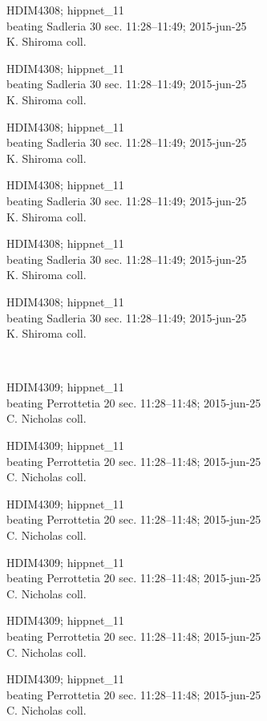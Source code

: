 \documentclass[2pt]{extarticle}
\begin{document}
\noindent
\parbox{0.16\textwidth}{\tiny \raggedright \rule[-0.3\baselineskip]{0pt}{10pt}HDIM4308; hippnet\_11\\ beating Sadleria 30 sec. 11:28--11:49; 2015-jun-25\\ K. Shiroma coll.}
\parbox{0.16\textwidth}{\tiny \raggedright \rule[-0.3\baselineskip]{0pt}{10pt}HDIM4308; hippnet\_11\\ beating Sadleria 30 sec. 11:28--11:49; 2015-jun-25\\ K. Shiroma coll.}
\parbox{0.16\textwidth}{\tiny \raggedright \rule[-0.3\baselineskip]{0pt}{10pt}HDIM4308; hippnet\_11\\ beating Sadleria 30 sec. 11:28--11:49; 2015-jun-25\\ K. Shiroma coll.}
\parbox{0.16\textwidth}{\tiny \raggedright \rule[-0.3\baselineskip]{0pt}{10pt}HDIM4308; hippnet\_11\\ beating Sadleria 30 sec. 11:28--11:49; 2015-jun-25\\ K. Shiroma coll.}
\parbox{0.16\textwidth}{\tiny \raggedright \rule[-0.3\baselineskip]{0pt}{10pt}HDIM4308; hippnet\_11\\ beating Sadleria 30 sec. 11:28--11:49; 2015-jun-25\\ K. Shiroma coll.}
\parbox{0.16\textwidth}{\tiny \raggedright \rule[-0.3\baselineskip]{0pt}{10pt}HDIM4308; hippnet\_11\\ beating Sadleria 30 sec. 11:28--11:49; 2015-jun-25\\ K. Shiroma coll.} \\ 
\vspace{0.001in} 

\noindent
\parbox{0.16\textwidth}{\tiny \raggedright \rule[-0.3\baselineskip]{0pt}{10pt}HDIM4309; hippnet\_11\\ beating Perrottetia 20 sec. 11:28--11:48; 2015-jun-25\\ C. Nicholas coll.}
\parbox{0.16\textwidth}{\tiny \raggedright \rule[-0.3\baselineskip]{0pt}{10pt}HDIM4309; hippnet\_11\\ beating Perrottetia 20 sec. 11:28--11:48; 2015-jun-25\\ C. Nicholas coll.}
\parbox{0.16\textwidth}{\tiny \raggedright \rule[-0.3\baselineskip]{0pt}{10pt}HDIM4309; hippnet\_11\\ beating Perrottetia 20 sec. 11:28--11:48; 2015-jun-25\\ C. Nicholas coll.}
\parbox{0.16\textwidth}{\tiny \raggedright \rule[-0.3\baselineskip]{0pt}{10pt}HDIM4309; hippnet\_11\\ beating Perrottetia 20 sec. 11:28--11:48; 2015-jun-25\\ C. Nicholas coll.}
\parbox{0.16\textwidth}{\tiny \raggedright \rule[-0.3\baselineskip]{0pt}{10pt}HDIM4309; hippnet\_11\\ beating Perrottetia 20 sec. 11:28--11:48; 2015-jun-25\\ C. Nicholas coll.}
\parbox{0.16\textwidth}{\tiny \raggedright \rule[-0.3\baselineskip]{0pt}{10pt}HDIM4309; hippnet\_11\\ beating Perrottetia 20 sec. 11:28--11:48; 2015-jun-25\\ C. Nicholas coll.} \\ 
\vspace{0.001in} 
\end{document}
